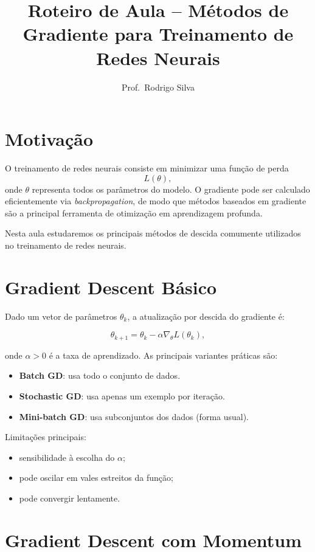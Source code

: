 \documentclass[9pt,a4paper]{extarticle}
\title{\vspace{-1cm}Roteiro de Aula -- Métodos de Gradiente para Treinamento de Redes Neurais}
\author{Prof.\ Rodrigo Silva}
\date{}
\begin{document}
\maketitle

\section{Motivação}
O treinamento de redes neurais consiste em minimizar uma função de perda 
\[
L(\theta),
\]
onde $\theta$ representa todos os parâmetros do modelo. O gradiente pode ser calculado eficientemente via \emph{backpropagation}, de modo que métodos baseados em gradiente são a principal ferramenta de otimização em aprendizagem profunda.

\vspace{0.2cm}
Nesta aula estudaremos os principais métodos de descida comumente utilizados no treinamento de redes neurais.

\section{Gradient Descent Básico}

Dado um vetor de parâmetros $\theta_k$, a atualização por descida do gradiente é:

\[
\theta_{k+1} = \theta_k - \alpha \nabla_\theta L(\theta_k),
\]

onde $\alpha > 0$ é a taxa de aprendizado. As principais variantes práticas são:

\begin{itemize}
    \item \textbf{Batch GD}: usa todo o conjunto de dados.
    \item \textbf{Stochastic GD}: usa apenas um exemplo por iteração.
    \item \textbf{Mini-batch GD}: usa subconjuntos dos dados (forma usual).
\end{itemize}

Limitações principais:
\begin{itemize}
    \item sensibilidade à escolha do $\alpha$;
    \item pode oscilar em vales estreitos da função;
    \item pode convergir lentamente.
\end{itemize}

\section{Gradient Descent com Momentum}
\end{document}
